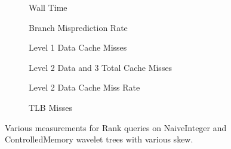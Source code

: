 \begin{figure}\tiny
\begin{subfigure}{0.48\textwidth}
	
	\caption{Wall Time}
	\label{fig:NaiveRankSkewRunningTime}
\end{subfigure}
\hfill
\begin{subfigure}{0.48\textwidth}
	
	\caption{Branch Misprediction Rate}
	\label{fig:NaiveVsControlledNodeMemorySkewRankQueryBMrate}
\end{subfigure}


\begin{subfigure}{0.48\textwidth}
	
	\caption{Level 1 Data Cache Misses}
	\label{fig:L1NaiveControlledNodeMemoryRankSkewCacheMisses}
\end{subfigure}
\hfill
\begin{subfigure}{0.48\textwidth}
 	
	\caption{Level 2 Data and 3 Total Cache Misses}
	\label{fig:L2L3NaiveControlledNodeMemoryRankSkewCacheMisses}
\end{subfigure}

\begin{subfigure}{0.48\textwidth}
	
	\caption{Level 2 Data Cache Miss Rate}
	\label{fig:NaiveVsControlledNodeMemorySkewRankQuery_L2_DCMrate}
\end{subfigure}
\hfill
\begin{subfigure}{0.48\textwidth}
	
	\caption{TLB Misses}
	\label{fig:NaiveVsControlledNodeMemorySkewRankQueryTLB}
\end{subfigure}

\caption{Various measurements for Rank queries on NaiveInteger and ControlledMemory wavelet trees with various skew.}
\label{fig:NaiveVsControlledNodeMemorySkewRankQuery}

\end{figure}






